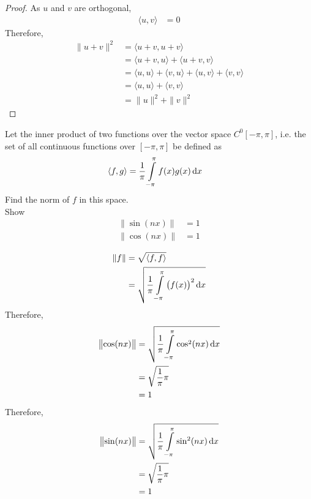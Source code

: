 \documentclass[fleqn, a4paper, 12pt, twoside]{article}
\theoremstyle{definition}
\theoremstyle{theorem}
\begin{document}
\begin{proof}
	As $u$ and $v$ are orthogonal,
	\begin{align*}
		\langle u,v \rangle & = 0
	\end{align*}
	Therefore,
	\begin{align*}
		\|u + v\|^2         & = \langle u + v , u + v \rangle                                                         \\
                                    & = \langle u + v , u \rangle + \langle u + v , v \rangle                                 \\
                                    & = \langle u,u \rangle + \langle v,u \rangle + \langle u,v \rangle + \langle v,v \rangle \\
                                    & = \langle u,u \rangle + \langle v,v \rangle                                             \\
                                    & = \|u\|^2 + \|v\|^2
	\end{align*}
\end{proof}

\begin{question}
	Let the inner product of two functions over the vector space $C^0[-\pi,\pi]$, i.e. the set of all continuous functions over $[-\pi,\pi]$ be defined as
	\begin{align*}
		\langle f,g \rangle & = \frac{1}{\pi} \int\limits_{-\pi}^{\pi} f(x) g(x) \dif x
	\end{align*}
	Find the norm of $f$ in this space.\\
	Show
	\begin{align*}
		\left\| \sin(n x) \right\| & = 1 \\
		\left\| \cos(n x) \right\| & = 1
	\end{align*}
\end{question}

\begin{solution}
	\begin{align*}
		\|f\| & = \sqrt{\langle f,f \rangle} \\
                      & = \sqrt{\frac{1}{\pi} \int\limits_{-\pi}^{\pi} \left( f(x) \right)^2 \dif x}
	\end{align*}
	Therefore,
	\begin{align*}
		\left\| \cos(n x) \right\| & = \sqrt{\frac{1}{\pi} \int\limits_{-\pi}^{\pi} \cos^2(n x) \dif x} \\
                                           & = \sqrt{\frac{1}{\pi} \pi}                                         \\
                                           & = 1
	\end{align*}
	Therefore,
	\begin{align*}
		\left\| \sin(n x) \right\| & = \sqrt{\frac{1}{\pi} \int\limits_{-\pi}^{\pi} \sin^2(n x) \dif x} \\
                                           & = \sqrt{\frac{1}{\pi} \pi}                                         \\
                                           & = 1
	\end{align*}
\end{solution}
\end{document}
